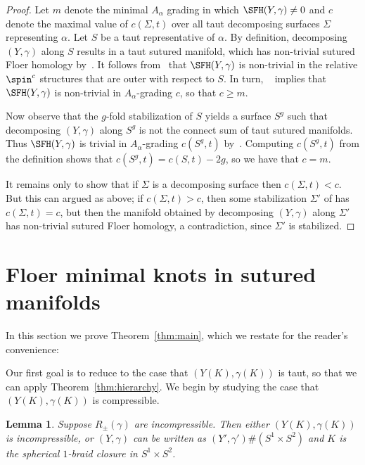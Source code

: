 \documentclass{amsart}
\newtheorem{lemma}[theorem]{Lemma}
\theoremstyle{definition}
\theoremstyle{remark}
\numberwithin{equation}{section}
\begin{document}
\begin{proof}
    Let $m$ denote the minimal $A_\alpha$ grading in which $\SFH(Y,\gamma)\neq 0$ and $c$ denote the maximal value of $c(\Sigma,t)$ over all taut decomposing surfaces $\Sigma$ representing $\alpha$. Let $S$ be a taut representative of $\alpha$. By definition, decomposing $(Y,\gamma)$ along $S$ results in a taut sutured manifold, which has non-trivial sutured Floer homology by~\cite[Theorem 1.4]{juhasz2008floer}. It follows from~\cite[Theorem 1.3]{juhasz2008floer} that $\SFH(Y,\gamma)$ is non-trivial in the relative $\spin^c$ structures that are outer with respect to $S$. In turn, ~\cite[Lemma 3.10]{juhasz2008floer} implies that $\SFH(Y,\gamma)$ is non-trivial in $A_\alpha$-grading $c$, so that $c\geq m$. 
    
    Now observe that the $g$-fold stabilization of $S$ yields a surface $S^g$ such that decomposing $(Y,\gamma)$ along $S^g$ is not the connect sum of taut sutured manifolds. Thus $\SFH(Y,\gamma)$ is trivial in $A_\alpha$-grading $c(S^g,t)$ by~\cite[Proposition 9.18]{juhasz2006holomorphic}. Computing $c(S^g,t)$ from the definition shows that $c(S^g,t)=c(S,t)-2g$, so we have that $c=m$.

    It remains only to show that if $\Sigma$ is a decomposing surface then $c(\Sigma,t)<c$. But this can argued as above; if $c(\Sigma,t)>c$, then some stabilization $\Sigma'$ of has $c(\Sigma,t)=c$, but then the manifold obtained by decomposing $(Y,\gamma)$ along $\Sigma'$ has non-trivial sutured Floer homology, a contradiction, since $\Sigma'$ is stabilized.
\end{proof}







\section{Floer minimal knots in sutured manifolds}\label{sec:mainthm}


In this section we prove Theorem~\ref{thm:main}, which we restate for the reader's convenience:



\main*

 Our first goal is to reduce to the case that $(Y(K),\gamma(K))$ is taut, so that we can apply Theorem~\ref{thm:hierarchy}. We begin by studying the case that $(Y(K),\gamma(K))$ is compressible.

\begin{lemma}\label{lem:incompressible}
    Suppose $R_\pm(\gamma)$ are incompressible. Then either $(Y(K),\gamma(K))$ is incompressible, or $(Y,\gamma)$ can be written as $(Y',\gamma')\#(S^1\times  S^2)$ and $K$ is the spherical $1$-braid closure in $S^1\times S^2$.
\end{lemma}
\end{document}
